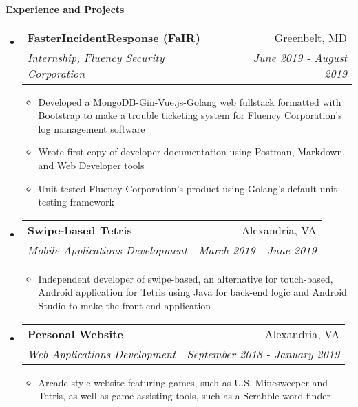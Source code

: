 \documentclass[letterpaper,11pt]{article}
\makeatletter
\newcommand{\resitem}[1]{\item #1 \vspace{-2pt}}
\newcommand{\resheading}[1]{{\large \colorbox{mygrey}{\begin{minipage}{\textwidth}{\textbf{#1 \vphantom{p\^{E}}}}\end{minipage}}}}
\newcommand{\ressubheading}[4]{
\begin{tabular*}{7.0in}{l@{\extracolsep{\fill}}r}
		\textbf{#1} & #2 \\
		\textit{#3} & \textit{#4} \\
\end{tabular*}\vspace{-6pt}}
\makeatother
\begin{document}
\resheading{Experience and Projects}

\begin{itemize}
\item
    \ressubheading{FasterIncidentResponse (FaIR)}{Greenbelt, MD}{Internship, Fluency Security Corporation}{June 2019 - August 2019}
	\begin{itemize}
		\resitem{Developed a MongoDB-Gin-Vue.js-Golang web fullstack formatted with Bootstrap to make a trouble ticketing system for Fluency Corporation's log management software}
		\resitem{Wrote first copy of developer documentation using Postman, Markdown, and Web Developer tools}
		\resitem{Unit tested Fluency Corporation's product using Golang's default unit testing framework}
	\end{itemize}
\item
    \ressubheading{Swipe-based Tetris}{Alexandria, VA}{Mobile Applications Development}{March 2019 - June 2019}
	\begin{itemize}
		\resitem{Independent developer of swipe-based, an alternative for touch-based, Android application for Tetris using Java for back-end logic and Android Studio to make the  front-end application}
	\end{itemize}
\item
    \ressubheading{Personal Website}{Alexandria, VA}{Web Applications Development}{September 2018 - January 2019}
	\begin{itemize}
		\resitem{Arcade-style website featuring games, such as U.S. Minesweeper and Tetris, as well as game-assisting tools, such as a Scrabble word finder}

\end{itemize}
\end{itemize}
\end{document}
